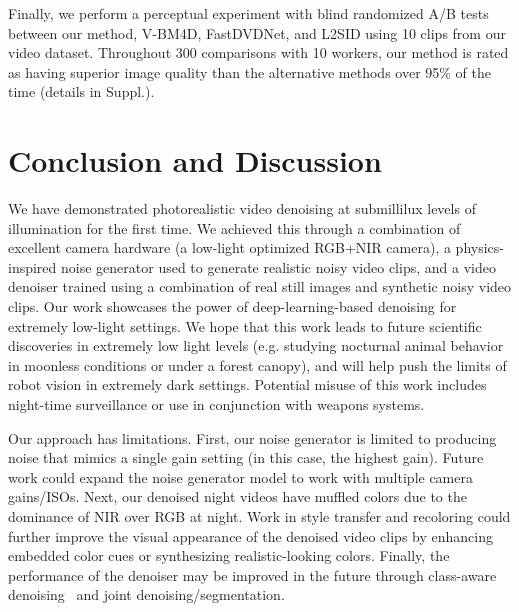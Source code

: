 \documentclass[final]{cvpr}
\begin{document}
Finally, we perform a perceptual experiment with blind randomized A/B tests between our method, V-BM4D, FastDVDNet, and L2SID using 10 clips from our video dataset. Throughout 300 comparisons with 10 workers, our method is rated as having superior image quality than the alternative methods over 95\% of the time (details in Suppl.).  


\section{Conclusion and Discussion}
We have demonstrated photorealistic video denoising at submillilux levels of illumination for the first time. We achieved this through a combination of excellent camera hardware (a low-light optimized RGB+NIR camera), a physics-inspired noise generator used to generate realistic noisy video clips, and a video denoiser trained using a combination of real still images and synthetic noisy video clips. Our work showcases the power of deep-learning-based denoising for extremely low-light settings. We hope that this work leads to future scientific discoveries in extremely low light levels (e.g. studying nocturnal animal behavior in moonless conditions or under a forest canopy), and will help push the limits of robot vision in extremely dark settings. Potential misuse of this work includes night-time surveillance or use in conjunction with weapons systems. 

Our approach has limitations. First, our noise generator is limited to producing noise that mimics a single gain setting (in this case, the highest gain). Future work could expand the noise generator model to work with multiple camera gains/ISOs. Next, our denoised night videos have muffled colors due to the dominance of NIR over RGB at night. Work in style transfer and recoloring could further improve the visual appearance of the denoised video clips by enhancing embedded color cues or synthesizing realistic-looking colors. Finally, the performance of the denoiser may be improved in the future through class-aware denoising~\cite{remez2018class} and joint denoising/segmentation. 





{\small


}
\end{document}

